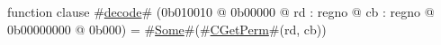 function clause #\hyperref[zdecode]{decode}# (0b010010 @ 0b00000 @ rd : regno @ cb : regno @ 0b00000000 @ 0b000) = #\hyperref[zSome]{Some}#(#\hyperref[zCGetPerm]{CGetPerm}#(rd, cb))
